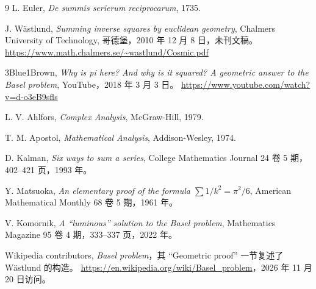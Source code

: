 {\small
\begin{thebibliography}{9}
L. Euler, \emph{De summis serierum reciprocarum}, 1735.

J. Wästlund, \emph{Summing inverse squares by euclidean geometry}, Chalmers University of Technology, 哥德堡，2010 年 12 月 8 日，未刊文稿。
\url{https://www.math.chalmers.se/~wastlund/Cosmic.pdf}

3Blue1Brown, \emph{Why is pi here? And why is it squared? A geometric answer to the Basel problem}, YouTube，2018 年 3 月 3 日。
\url{https://www.youtube.com/watch?v=d-o3eB9sfls}

L. V. Ahlfors, \emph{Complex Analysis}, McGraw-Hill, 1979.

T. M. Apostol, \emph{Mathematical Analysis}, Addison-Wesley, 1974.

D. Kalman, \emph{Six ways to sum a series}, College Mathematics Journal 24 卷 5 期，402--421 页，1993 年。

Y. Matsuoka, \emph{An elementary proof of the formula $\sum 1/k^{2}=\pi^{2}/6$},
American Mathematical Monthly 68 卷 5 期，1961 年。

V. Komornik, \emph{A ``luminous'' solution to the Basel problem},
Mathematics Magazine 95 卷 4 期，333--337 页，2022 年。

{Wikipedia contributors}, \emph{Basel problem}，其 ``Geometric proof'' 一节复述了 Wästlund 的构造。
\url{https://en.wikipedia.org/wiki/Basel_problem}，2026 年 11 月 20 日访问。
\end{thebibliography}}
